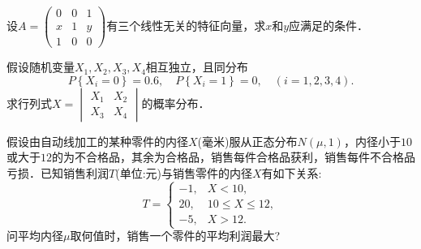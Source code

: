 \documentclass[plain,noanswer,medmath]{../../template/jnuexam}
\begin{document}

\begin{problem}
设$A = \begin{pmatrix}
  0 & 0 & 1 \\
  x & 1 & y \\
  1 & 0 & 0
\end{pmatrix}$有三个线性无关的特征向量，求$x$和$y$应满足的条件．
\end{problem}



\begin{problem}
假设随机变量$X_1,X_2,X_3,X_4$相互独立，且同分布
$$P\left\{X_i = 0 \right\} = 0.6,\quad P\left\{X_i = 1 \right\} = 0,\quad (i = 1,2,3,4).$$
求行列式$X = \begin{vmatrix}
  X_1 & X_2 \\
  X_3 & X_4
\end{vmatrix}$的概率分布．
\end{problem}



\begin{problem}
假设由自动线加工的某种零件的内径$X$(毫米)服从正态分布$N(\mu ,1)$，内径小于$10$ 或大于$12$的为不合格品，其余为合格品，销售每件合格品获利，销售每件不合格品亏损．已知销售利润$T$(单位:元)与销售零件的内径$X$有如下关系:
$$T = \begin{cases}
  -1, & X < 10, \\
  20, & 10 \le X \le 12, \\
  -5, & X > 12.
\end{cases}$$
问平均内径$\mu$取何值时，销售一个零件的平均利润最大?
\end{problem}
\end{document}

